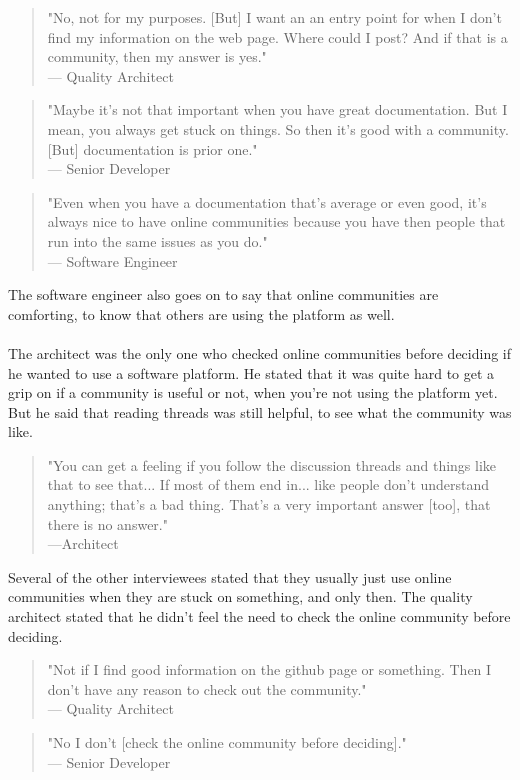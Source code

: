 \documentclass{article}
\begin{document}
\begin{quote}
"No, not for my purposes. [But] I want an an entry point for when I don't find my information on the web page. Where could I post? And if that is a community, then my answer is yes."\\ --- Quality Architect
\end{quote}
\begin{quote}
"Maybe it's not that important when you have great documentation. But I mean, you always get stuck on things. So then it's good with a community. [But] documentation is prior one."\\--- Senior Developer
\end{quote}
\begin{quote}
"Even when you have a documentation that's average or even good, it's always nice  to have online communities because you have then people that run into the same issues as you do." \\--- Software Engineer
\end{quote}
The software engineer also goes on to say that online communities are comforting, to know that others are using the platform as well.
\\ \\
The architect was the only one who checked online communities before deciding if he wanted to use a software platform. He stated that it was quite hard to get a grip on if a community is useful or not, when you're not using the platform yet. But he said that reading threads was still helpful, to see what the community was like.
\begin{quote}
"You can get a feeling if you follow the discussion threads and things like that to see that... If most of them end in... like people don't understand anything; that's a bad thing. That's a very important answer [too], that there is no answer."\\---Architect
\end{quote}
Several of the other interviewees stated that they usually just use online communities when they are stuck on something, and only then. The quality architect stated that he didn't feel the need to check the online community before deciding.
\begin{quote}
"Not if I find good information on the github page or something. Then I don't have any reason to check out the community."\\--- Quality Architect
\end{quote}
\begin{quote}
"No I don't [check the online community before deciding]." \\--- Senior Developer
\end{quote}
\end{document}
